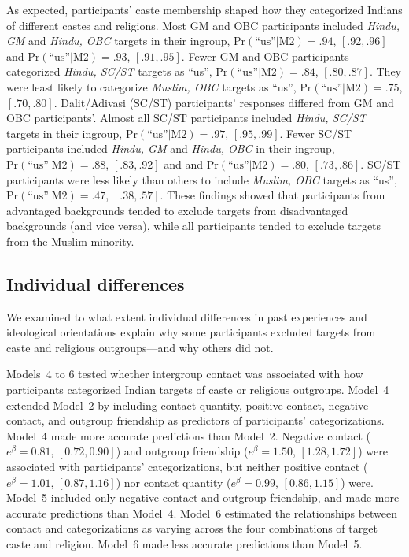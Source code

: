\documentclass[12pt, a4paper]{article}
\newcommand{\pest}[4]{$ \text{Pr} (\text{``us''} | \text{#1}) = #2$, $[#3, #4]$}
\begin{document}
As expected, participants' caste membership shaped how they categorized Indians of different castes and religions. Most GM and OBC participants included \emph{Hindu, GM} and \emph{Hindu, OBC} targets in their ingroup, \pest{M2}{.94}{.92}{.96} and \pest{M2}{.93}{.91}{.95}. Fewer GM and OBC participants categorized \emph{Hindu, SC/ST} targets as ``us'', \pest{M2}{.84}{.80}{.87}. They were least likely to categorize \emph{Muslim, OBC} targets as ``us'', \pest{M2}{.75}{.70}{.80}. Dalit/Adivasi (SC/ST) participants' responses differed from GM and OBC participants'. Almost all SC/ST participants included \emph{Hindu, SC/ST} targets in their ingroup, \pest{M2}{.97}{.95}{.99}. Fewer SC/ST participants included \emph{Hindu, GM} and \emph{Hindu, OBC} in their ingroup, \pest{M2}{.88}{.83}{.92} and  and \pest{M2}{.80}{.73}{.86}. SC/ST participants were less likely than others to include \emph{Muslim, OBC} targets as ``us'', \pest{M2}{.47}{.38}{.57}. These findings showed that participants from advantaged backgrounds tended to exclude targets from disadvantaged backgrounds (and vice versa), while all participants tended to exclude targets from the Muslim minority.

\subsection{Individual differences}

We examined to what extent individual differences in past experiences and ideological orientations explain why some participants excluded targets from caste and religious outgroups---and why others did not.

Models~4 to 6 tested whether intergroup contact was associated with how participants categorized Indian targets of caste or religious outgroups. Model~4 extended Model~2 by including contact quantity, positive contact, negative contact, and outgroup friendship as predictors of participants' categorizations. Model~4 made more accurate predictions than Model~2. Negative contact ($e^\beta = 0.81$, $[0.72, 0.90]$) and outgroup friendship ($e^\beta = 1.50$, $[1.28, 1.72]$) were associated with participants' categorizations, but neither positive contact ($e^\beta = 1.01$, $[0.87, 1.16]$) nor contact quantity ($e^\beta = 0.99$, $[0.86, 1.15]$) were. Model~5 included only negative contact and outgroup friendship, and made more accurate predictions than Model~4. Model~6 estimated the relationships between contact and categorizations as varying across the four combinations of target caste and religion. Model~6 made less accurate predictions than Model~5.
\end{document}
